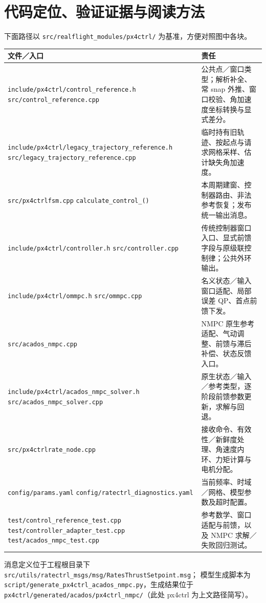 \documentclass[UTF8,a4paper,11pt,fontset=fandol]{ctexart}
\newcommand{\code}[1]{{\small\nolinkurl{#1}}}
\begin{document}
\section{代码定位、验证证据与阅读方法}
\label{sec:code}
下面路径以 \code{src/realflight_modules/px4ctrl/} 为基准，方便对照图中各块。
\begin{small}
\begin{longtable}{L{6.8cm}L{8.0cm}}
\toprule
文件／入口 & 责任 \\\midrule
\endhead
\code{include/px4ctrl/control_reference.h}\newline
\code{src/control_reference.cpp} & 公共点／窗口类型；解析补全、常 snap 外推、窗口校验、角加速度坐标转换与显式差分。\\
\code{include/px4ctrl/legacy_trajectory_reference.h}\newline
\code{src/legacy_trajectory_reference.cpp} & 临时持有旧轨迹、按起点与请求网格采样、估计缺失角加速度。\\
\code{src/px4ctrlfsm.cpp}\newline
\code{calculate_control_()} & 本周期建窗、控制器路由、非法参考恢复；发布统一输出消息。\\
\code{include/px4ctrl/controller.h}\newline
\code{src/controller.cpp} & 传统控制器窗口入口、显式前馈字段与原级联控制律；公共外环输出。\\
\code{include/px4ctrl/ommpc.h}\newline
\code{src/ommpc.cpp} & 名义状态／输入窗口适配、局部误差 QP、首点前馈下发。\\
\code{src/acados_nmpc.cpp} & NMPC 原生参考适配、气动调整、前馈与滞后补偿、状态反馈入口。\\
\code{include/px4ctrl/acados_nmpc_solver.h}\newline
\code{src/acados_nmpc_solver.cpp} & 原生状态／输入／参考类型，逐阶段前馈参数更新，求解与回退。\\
\code{src/px4ctrlrate_node.cpp} & 接收命令、有效性／新鲜度处理、角速度内环、力矩计算与电机分配。\\
\code{config/params.yaml}\newline
\code{config/ratectrl_diagnostics.yaml} & 当前频率、时域／网格、模型参数及超时配置。\\
\code{test/control_reference_test.cpp}\newline
\code{test/controller_adapter_test.cpp}\newline
\code{test/acados_nmpc_test.cpp} & 参考数学、窗口适配与前馈，以及 NMPC 求解／失败回归测试。\\
\bottomrule
\end{longtable}
\end{small}
消息定义位于工程根目录下
\code{src/utils/ratectrl_msgs/msg/RatesThrustSetpoint.msg}；
模型生成脚本为 \code{script/generate_px4ctrl_acados_nmpc.py}，生成结果位于
\code{px4ctrl/generated/acados/px4ctrl_nmpc/}（此处 px4ctrl 为上文路径简写）。
\end{document}
